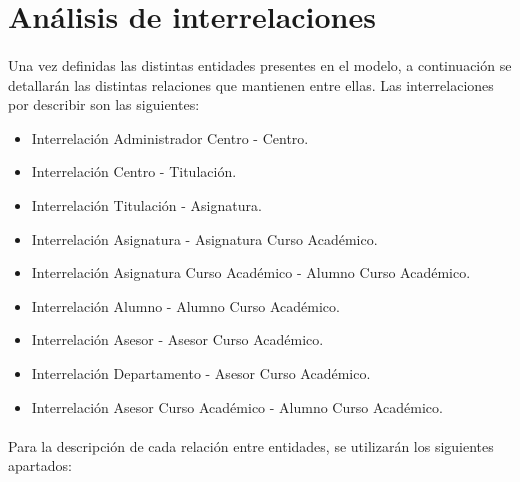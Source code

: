 \section{Análisis de interrelaciones}

   \paragraph{}Una vez definidas las distintas entidades presentes en el
   modelo, a continuación se detallarán las distintas relaciones que mantienen
   entre ellas. Las interrelaciones por describir son las siguientes:

   \begin{itemize}
    \item Interrelación Administrador Centro - Centro.
    \item Interrelación Centro - Titulación.
    \item Interrelación Titulación - Asignatura.
    \item Interrelación Asignatura - Asignatura Curso Académico.
    \item Interrelación Asignatura Curso Académico - Alumno Curso Académico.
    \item Interrelación Alumno - Alumno Curso Académico.
    \item Interrelación Asesor - Asesor Curso Académico.
    \item Interrelación Departamento - Asesor Curso Académico.
    \item Interrelación Asesor Curso Académico - Alumno Curso Académico.
   \end{itemize}

   \paragraph{}Para la descripción de cada relación entre entidades, se
   utilizarán los siguientes apartados:

